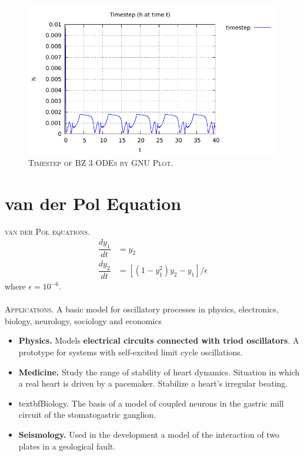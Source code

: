 \documentclass[a4paper,oneside]{book}
\numberwithin{equation}{chapter}
\begin{document}
\begin{figure}[H]
\centering
\includegraphics[scale=1.1]{bz3_ts}
\caption{\textsc{Timestep of BZ 3 ODEs by GNU Plot.}}
\end{figure}



\section{van der Pol Equation}
\textsc{van der Pol equations.} 
\begin{align}
    \dfrac{dy_1}{dt}  &=  y_2
    \\
    \dfrac{dy_2}{dt}  &=  [ (1-y_1^2)y_2 - y_1 ] / \epsilon
\end{align}
where $\epsilon = 10^{-6}$.\\
\\
\textsc{Applications.} A basic model for oscillatory processes in physics, electronics, biology, neurology, sociology and economics
\begin{itemize}
\item \textbf{Physics.} Models \textbf{electrical circuits connected with triod oscillators}. A prototype for systems with self-excited limit cycle oscillations.
\item \textbf{Medicine.} Study the range of stability of heart dynamics. Situation in which a real heart is driven by a pacemaker. Stabilize a heart's irregular beating.
\item textbf{Biology.} The basis of a model of coupled neurons in the gastric mill circuit of the stomatogastric ganglion.
\item \textbf{Seismology.} Used in the development a model of the interaction of two plates in a geological fault.
\end{itemize}
\end{document}
